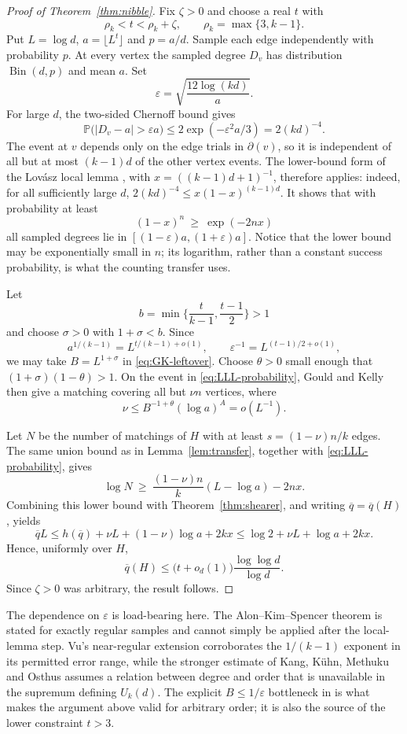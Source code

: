 \documentclass[10pt,a4paper]{amsart}
\newcommand{\PP}{\mathbb{P}}
\newcommand{\qbar}{\overline{q}}
\newcommand{\Bin}{\operatorname{Bin}}
\newcommand{\dg}{\partial}
\begin{document}
\begin{proof}[Proof of Theorem~\ref{thm:nibble}]
Fix $\zeta>0$ and choose a real $t$ with
\[
  \rho_k<t<\rho_k+\zeta,
  \qquad \rho_k=\max\{3,k-1\}.
\]
Put $L=\log d$, $a=\lfloor L^t\rfloor$ and $p=a/d$. Sample each edge independently
with probability $p$. At every vertex the sampled degree $D_v$ has distribution
$\Bin(d,p)$ and mean $a$. Set
\[
  \varepsilon=\sqrt{\frac{12\log(kd)}a}.
\]
For large $d$, the two-sided Chernoff bound gives
\[
  \PP\bigl(|D_v-a|>\varepsilon a\bigr)
  \le 2\exp(-\varepsilon^2a/3)=2(kd)^{-4}.
\]
The event at $v$ depends only on the edge trials in $\dg(v)$, so it is independent of
all but at most $(k-1)d$ of the other vertex events. The lower-bound form of the
Lov\'asz local lemma \cite[Chapter 5]{AlonSpencer}, with
$x=((k-1)d+1)^{-1}$, therefore applies: indeed, for all
sufficiently large $d$, $2(kd)^{-4}\le x(1-x)^{(k-1)d}$. It shows that with probability
at least
\begin{equation}
\label{eq:LLL-probability}
  (1-x)^n\ \ge\ \exp(-2nx)
\end{equation}
all sampled degrees lie in $[(1-\varepsilon)a,(1+\varepsilon)a]$. Notice that the
lower bound may be exponentially small in $n$; its logarithm, rather than a constant
success probability, is what the counting transfer uses.

Let
\[
  b=\min\biggl\{\frac{t}{k-1},\frac{t-1}{2}\biggr\}>1
\]
and choose $\sigma>0$ with $1+\sigma<b$. Since
\[
  a^{1/(k-1)}=L^{t/(k-1)+o(1)},
  \qquad
  \varepsilon^{-1}=L^{(t-1)/2+o(1)},
\]
we may take $B=L^{1+\sigma}$ in \eqref{eq:GK-leftover}. Choose $\theta>0$ small
enough that $(1+\sigma)(1-\theta)>1$. On the event in
\eqref{eq:LLL-probability}, Gould and Kelly then give a matching covering all but
$\nu n$ vertices, where
\[
  \nu\le B^{-1+\theta}(\log a)^A=o(L^{-1}).
\]

Let $N$ be the number of matchings of $H$ with at least
$s=(1-\nu)n/k$ edges. The same union bound as in Lemma~\ref{lem:transfer}, together
with \eqref{eq:LLL-probability}, gives
\[
  \log N\ \ge\ \frac{(1-\nu)n}{k}(L-\log a)-2nx.
\]
Combining this lower bound with Theorem~\ref{thm:shearer}, and writing
$\qbar=\qbar(H)$, yields
\[
  \qbar L
  \le h(\qbar)+\nu L+(1-\nu)\log a+2kx
  \le \log2+\nu L+\log a+2kx.
\]
Hence, uniformly over $H$,
\[
  \qbar(H)\le\bigl(t+o_d(1)\bigr)\frac{\log\log d}{\log d}.
\]
Since $\zeta>0$ was arbitrary, the result follows.
\end{proof}

The dependence on $\varepsilon$ is load-bearing here. The Alon--Kim--Spencer theorem
\cite{AlonKimSpencer} is stated for exactly regular samples and cannot simply be applied
after the local-lemma step. Vu's near-regular extension \cite{Vu} corroborates the
$1/(k-1)$ exponent in its permitted error range, while the stronger estimate of Kang,
K\"uhn, Methuku and Osthus \cite{KKMO} assumes a relation between degree and order that
is unavailable in the supremum defining $U_k(d)$. The explicit
$B\le1/\varepsilon$ bottleneck in \cite{GouldKelly} is what makes the argument above
valid for arbitrary order; it is also the source of the lower constraint $t>3$.
\end{document}
